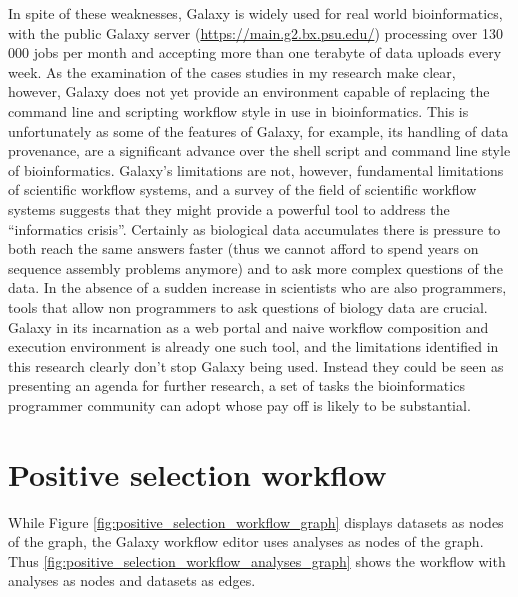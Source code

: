 \documentclass[a4paper,10pt]{scrreprt}
\begin{document}
In spite of these weaknesses, Galaxy is widely used for real world bioinformatics, with the public Galaxy server (\url{https://main.g2.bx.psu.edu/}) processing over 130 000 jobs per month and accepting more than one terabyte of data uploads every week. \cite{nekrutenko_introduction_2011} As the examination of the cases studies in my research make clear, however, Galaxy does not yet provide an environment capable of replacing the command line and scripting workflow style in use in bioinformatics. This is unfortunately as some of the features of Galaxy, for example, its handling of data provenance, are a significant advance over the shell script and command line style of bioinformatics. Galaxy's limitations are not, however, fundamental limitations of scientific workflow systems, and a survey of the field of scientific workflow systems suggests that they might provide a powerful tool to address the ``informatics crisis''. Certainly as biological data accumulates there is pressure to both reach the same answers 
faster (thus we cannot afford to spend years on sequence assembly problems anymore) and to ask more complex questions of the data. In the absence of a sudden increase in scientists who are also programmers, tools that allow non programmers to ask questions of biology data are crucial. Galaxy in its incarnation as a web portal and naive workflow composition and execution environment is already one such tool, and the limitations identified in this research clearly don't stop Galaxy being used. Instead they could be seen as presenting an agenda for further research, a set of tasks the bioinformatics programmer community can adopt whose pay off is likely to be substantial.

\printglossary

\cleardoublepage
{}
{}


\appendix
\appendixpage
\addappheadtotoc


\chapter{Positive selection workflow}

\label{sec:positive_selection_workflow_analyses_graph}

While Figure \ref{fig:positive_selection_workflow_graph} displays datasets as nodes of the graph, the Galaxy workflow editor uses analyses as nodes of the graph. Thus \ref{fig:positive_selection_workflow_analyses_graph} shows the workflow with analyses as nodes and datasets as edges.
\end{document}
